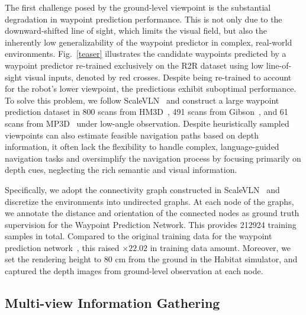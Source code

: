 The first challenge posed by the ground-level viewpoint is the substantial degradation in waypoint prediction performance. This is not only due to the downward-shifted line of sight, which limits the visual field, but also the inherently low generalizability of the waypoint predictor in complex, real-world environments. Fig.~\ref{teaser} illustrates the candidate waypoints predicted by a waypoint predictor re-trained exclusively on the R2R dataset using low line-of-sight visual inputs, denoted by red crosses. Despite being re-trained to account for the robot's lower viewpoint, the predictions exhibit suboptimal performance. To solve this problem, we follow ScaleVLN~\cite{wang2023scaling} and construct a large waypoint prediction dataset in 800 scans from HM3D~\cite{ramakrishnan2021habitat}, 491 scans from Gibson~\cite{xia2018gibson}, and 61 scans from MP3D~\cite{chang2017matterport3d} under low-angle observation. Despite heuristically sampled viewpoints can also estimate feasible navigation paths based on depth information, it often lack the flexibility to handle complex, language-guided navigation tasks and oversimplify the navigation process by focusing primarily on depth cues, neglecting the rich semantic and visual information.

Specifically, we adopt the connectivity graph constructed in ScaleVLN~\cite{wang2023scaling} and discretize the environments into undirected graphs. At each node of the graphs, we annotate the distance and orientation of the connected nodes as ground truth supervision for the Waypoint Prediction Network. This provides 212924 training samples in total. Compared to the original training data for the waypoint prediction network~\cite{hong2022bridging}, this raised $\times 22.02$ in training data amount. Moreover, we set the rendering height to 80 cm from the ground in the Habitat simulator, and captured the depth images from ground-level observation at each node. 

\subsection{Multi-view Information Gathering}

